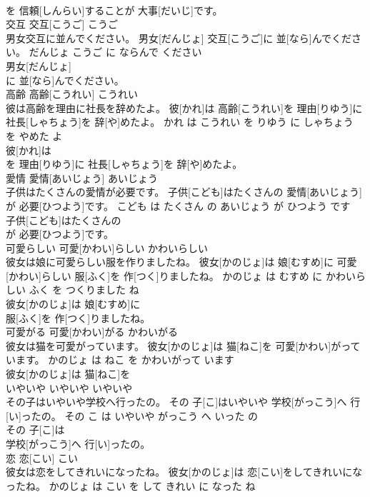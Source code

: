 \documentclass[8pt]{extreport}
\begin{document}
\begin{CJK}{UTF8}{min}
\\	を 信頼[しんらい]することが 大事[だいじ]です。			
\\	交互	交互[こうご]	こうご	
\\	男女交互に並んでください。	男女[だんじょ] 交互[こうご]に 並[なら]んでください。	だんじょ こうご に ならんで ください	
\\	男女[だんじょ]
\\	に 並[なら]んでください。			
\\	高齢	高齢[こうれい]	こうれい	
\\	彼は高齢を理由に社長を辞めたよ。	彼[かれ]は 高齢[こうれい]を 理由[りゆう]に 社長[しゃちょう]を 辞[や]めたよ。	かれ は こうれい を りゆう に しゃちょう を やめた よ	
\\	彼[かれ]は
\\	を 理由[りゆう]に 社長[しゃちょう]を 辞[や]めたよ。			
\\	愛情	愛情[あいじょう]	あいじょう	
\\	子供はたくさんの愛情が必要です。	子供[こども]はたくさんの 愛情[あいじょう]が 必要[ひつよう]です。	こども は たくさん の あいじょう が ひつよう です	
\\	子供[こども]はたくさんの
\\	が 必要[ひつよう]です。			
\\	可愛らしい	可愛[かわい]らしい	かわいらしい	
\\	彼女は娘に可愛らしい服を作りましたね。	彼女[かのじょ]は 娘[むすめ]に 可愛[かわい]らしい 服[ふく]を 作[つく]りましたね。	かのじょ は むすめ に かわいらしい ふく を つくりました ね	
\\	彼女[かのじょ]は 娘[むすめ]に
\\	服[ふく]を 作[つく]りましたね。			
\\	可愛がる	可愛[かわい]がる	かわいがる	
\\	彼女は猫を可愛がっています。	彼女[かのじょ]は 猫[ねこ]を 可愛[かわい]がっています。	かのじょ は ねこ を かわいがって います	
\\	彼女[かのじょ]は 猫[ねこ]を
\\	いやいや	いやいや	いやいや	
\\	その子はいやいや学校へ行ったの。	その 子[こ]はいやいや 学校[がっこう]へ 行[い]ったの。	その こ は いやいや がっこう へ いった の	
\\	その 子[こ]は
\\	学校[がっこう]へ 行[い]ったの。			
\\	恋	恋[こい]	こい	
\\	彼女は恋をしてきれいになったね。	彼女[かのじょ]は 恋[こい]をしてきれいになったね。	かのじょ は こい を して きれい に なった ね	

\end{CJK}
\end{document}
